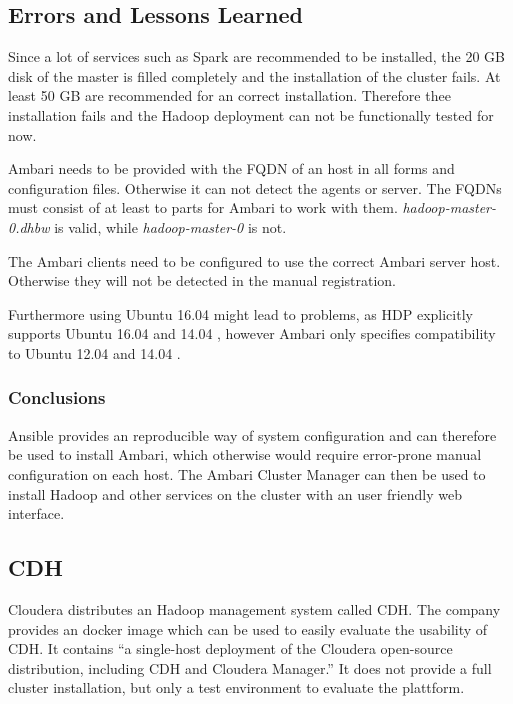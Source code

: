 \subsection{Errors and Lessons Learned}
\label{sec:ambari:errors}
Since a lot of services such as Spark are recommended to be installed, 
the 20 \ac{GB} disk of the master is filled completely and the installation of the cluster fails. At least 50 \ac{GB} are recommended for an correct installation.
Therefore thee installation fails and the Hadoop deployment can not be functionally tested for now.

Ambari needs to be provided with the \ac{FQDN} of an host 
in all forms and configuration files. 
Otherwise it can not detect the agents or server.
The \acp{FQDN} must consist of at least to parts for Ambari to work with them. 
\emph{hadoop-master-0.dhbw} is valid, while \emph{hadoop-master-0} is not.

The Ambari clients need to be configured 
to use the correct Ambari server host.
Otherwise they will not be detected in the manual registration.

Furthermore using Ubuntu 16.04 might lead to problems, as \ac{HDP} explicitly supports Ubuntu 16.04 and 14.04 \autocite[][]{hortonworks2018requirements}, however Ambari only specifies compatibility to Ubuntu 12.04 and 14.04 \autocite[][]{ambari2018ambari}.


\subsubsection{Conclusions}
Ansible provides an reproducible way of system configuration 
and can therefore be used to install Ambari, 
which otherwise would require error-prone manual configuration on each host.
The Ambari Cluster Manager can then be used to install Hadoop and other services on the cluster with an user friendly web interface.


\subsection{\acl{CDH}}

Cloudera distributes an Hadoop management system called \ac{CDH}.
The company provides an docker image which can be used to easily evaluate the usability of \ac{CDH}.
It contains \enquote{a single-host deployment of the Cloudera open-source distribution, including CDH and Cloudera Manager.} \autocite[][]{cloudera2018docker}
It does not provide a full cluster installation, but only a test environment to evaluate the plattform.

